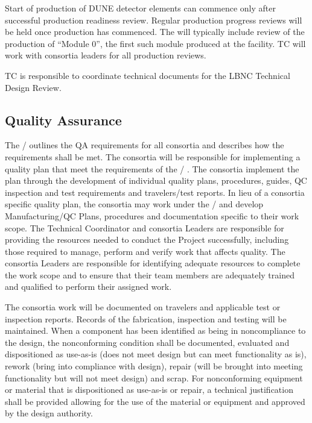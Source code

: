 Start of production of DUNE detector elements can commence only after
successful production readiness review. Regular production progress
reviews will be held once production has commenced. The 
will typically include review of the production of ``Module 0'', the
first such module produced at the facility. TC will work with
consortia leaders for all production reviews.

TC is responsible to coordinate technical documents for the LBNC
Technical Design Review.

\subsection{Quality Assurance}
\label{sec:fdsp-coord-qa}


The /  outlines the QA requirements
for all  consortia and describes how the requirements
shall be met. The consortia will be responsible for implementing a
quality plan that meet the requirements of the
/ .  The consortia implement the
plan through the development of individual quality plans, procedures,
guides, QC inspection and test requirements and travelers/test
reports.  In lieu of a consortia specific quality plan, the consortia
may work under the /  and develop
Manufacturing/QC Plans, procedures and documentation specific to their
work scope.  The  Technical Coordinator and consortia
Leaders are responsible for providing the resources needed to conduct
the Project successfully, including those required to manage, perform
and verify work that affects quality.  The  consortia
Leaders are responsible for identifying adequate resources to complete
the work scope and to ensure that their team members are adequately
trained and qualified to perform their assigned work.

The consortia work will be documented on travelers and applicable test
or inspection reports. Records of the fabrication, inspection and
testing will be maintained. When a component has been identified as
being in noncompliance to the design, the nonconforming condition
shall be documented, evaluated and dispositioned as use-as-is (does
not meet design but can meet functionality as is), rework (bring into
compliance with design), repair (will be brought into meeting
functionality but will not meet design) and scrap. For nonconforming
equipment or material that is dispositioned as use-as-is or repair, a
technical justification shall be provided allowing for the use of the
material or equipment and approved by the design authority.

